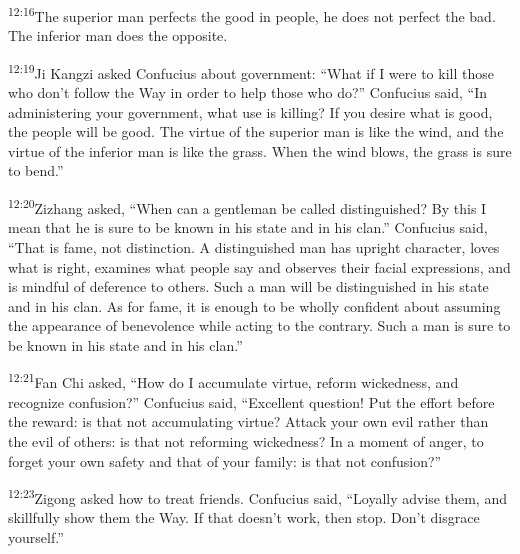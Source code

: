 \documentclass[openany,12pt,english]{book}
\newenvironment{para}{\par\pretolerance=100\tolerance=200\setlength{\emergencystretch}{0.6em}\relax}{\par}
\begin{document}
\begin{para}
    \textsuperscript{12:16}\thinspace{}The su\-pe\-ri\-or man perfects the good in peo\-ple, he does not per\-fect the bad. The in\-fe\-ri\-or man does the op\-po\-site.
\end{para}

\begin{para}
    \textsuperscript{12:19}\thinspace{}Ji Kangzi asked Con\-fu\-cius a\-bout gov\-ern\-ment: “What if I were to kill those who don't fol\-low the Way in or\-der to help those who do?” Con\-fu\-cius said, “In administering your gov\-ern\-ment, what use is kill\-ing? If you de\-sire what is good, the peo\-ple will be good. The vir\-tue of the su\-pe\-ri\-or man is like the wind, and the vir\-tue of the in\-fe\-ri\-or man is like the grass. When the wind blows, the grass is sure to bend.”
\end{para}

\begin{para}
    \textsuperscript{12:20}\thinspace{}Zizhang asked, “When can a gen\-tle\-man be called dis\-tin\-guished? By this I mean that he is sure to be known in his state and in his clan.” Con\-fu\-cius said, “That is fame, not dis\-tinc\-tion. A dis\-tin\-guished man has up\-right char\-ac\-ter, loves what is right, examines what peo\-ple say and observes their fa\-cial expressions, and is mind\-ful of def\-er\-ence to others. Such a man will be dis\-tin\-guished in his state and in his clan. As for fame, it is e\-nough to be whol\-ly con\-fi\-dent a\-bout as\-sum\-ing the ap\-pear\-ance of be\-nev\-o\-lence while act\-ing to the con\-tra\-ry. Such a man is sure to be known in his state and in his clan.”
\end{para}

\begin{para}
    \textsuperscript{12:21}\thinspace{}Fan Chi asked, “How do I ac\-cu\-mu\-late vir\-tue, re\-form wick\-ed\-ness, and rec\-og\-nize con\-fu\-sion?” Con\-fu\-cius said, “Ex\-cel\-lent ques\-tion! Put the ef\-fort be\-fore the re\-ward: is that not ac\-cu\-mu\-lat\-ing vir\-tue? At\-tack your own evil rath\-er than the evil of others: is that not reforming wick\-ed\-ness? In a mo\-ment of an\-ger, to for\-get your own safe\-ty and that of your fam\-i\-ly: is that not con\-fu\-sion?”
\end{para}

\begin{para}
    \textsuperscript{12:23}\thinspace{}Zigong asked how to treat friends. Con\-fu\-cius said, “Loy\-al\-ly ad\-vise them, and skill\-ful\-ly show them the Way. If that does\-n't work, then stop. Don't dis\-grace your\-self.”
\end{para}
\end{document}
